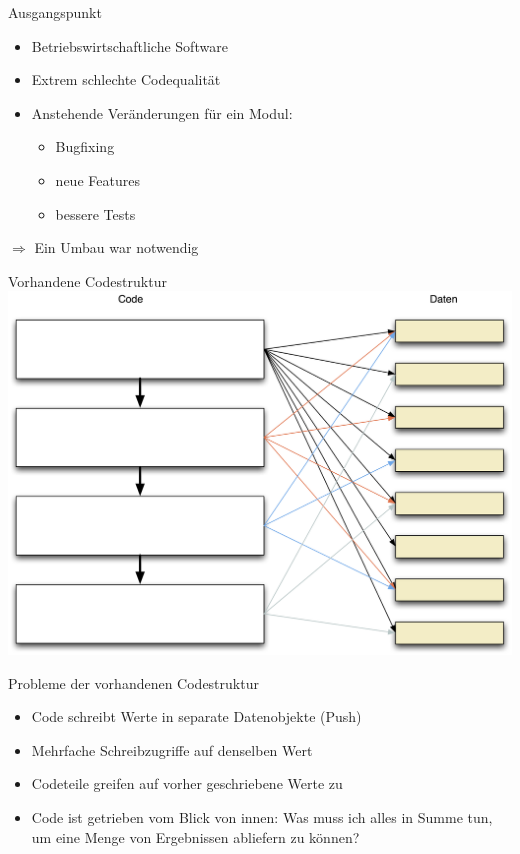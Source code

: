 
\begin{frame}[fragile]{Ausgangspunkt}
\begin{itemize}
\item Betriebswirtschaftliche Software
\item Extrem schlechte Codequalität
\item Anstehende Veränderungen für ein Modul:
\begin{itemize}
\item Bugfixing
\item neue Features
\item bessere Tests
\end{itemize}
\end{itemize}

$\Rightarrow$ Ein Umbau war notwendig
\end{frame}

\begin{frame}[fragile]{Vorhandene Codestruktur}
\includegraphics[width=.8 \paperwidth]{Codestruktur.png}
\end{frame}

\begin{frame}[fragile]{Probleme der vorhandenen Codestruktur}
\begin{itemize}
\item Code schreibt Werte in separate Datenobjekte (\glqq Push\grqq{})
\item Mehrfache Schreibzugriffe auf denselben Wert
\item Codeteile greifen auf vorher geschriebene Werte zu
\item Code ist getrieben vom Blick von innen: Was muss ich alles in Summe tun, um eine Menge von Ergebnissen abliefern zu können?
\end{itemize}
\end{frame}



